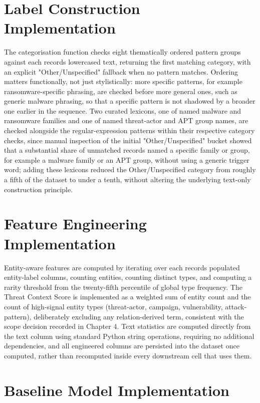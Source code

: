 \documentclass[12pt,a4paper]{report}
\begin{document}
\section{Label Construction
Implementation}\label{label-construction-implementation}

The categorisation function checks eight thematically ordered pattern
groups against each record\textquotesingle s lowercased text, returning
the first matching category, with an explicit "Other/Unspecified"
fallback when no pattern matches. Ordering matters functionally, not
just stylistically: more specific patterns, for example
ransomware-specific phrasing, are checked before more general ones, such
as generic malware phrasing, so that a specific pattern is not shadowed
by a broader one earlier in the sequence. Two curated lexicons, one of
named malware and ransomware families and one of named threat-actor and
APT group names, are checked alongside the regular-expression patterns
within their respective category checks, since manual inspection of the
initial "Other/Unspecified" bucket showed that a substantial share of
unmatched records named a specific family or group, for example a
malware family or an APT group, without using a generic trigger word;
adding these lexicons reduced the Other/Unspecified category from
roughly a fifth of the dataset to under a tenth, without altering the
underlying text-only construction principle.
\section{Feature Engineering
Implementation}\label{feature-engineering-implementation}

Entity-aware features are computed by iterating over each
record\textquotesingle s populated entity-label columns, counting
entities, counting distinct types, and computing a rarity threshold from
the twenty-fifth percentile of global type frequency. The Threat Context
Score is implemented as a weighted sum of entity count and the count of
high-signal entity types (threat-actor, campaign, vulnerability,
attack-pattern), deliberately excluding any relation-derived term,
consistent with the scope decision recorded in Chapter 4. Text
statistics are computed directly from the text column using standard
Python string operations, requiring no additional dependencies, and all
engineered columns are persisted into the dataset once computed, rather
than recomputed inside every downstream cell that uses them.
\section{Baseline Model
Implementation}\label{baseline-model-implementation}
\end{document}
